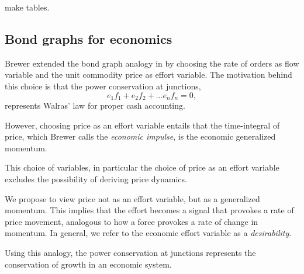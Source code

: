 \begin{tcolorbox}
make tables.
\end{tcolorbox}

\subsection{Bond graphs for economics}
Brewer extended the bond graph analogy in \cite{} by choosing the rate of orders as flow variable and the unit commodity price as effort variable.
The motivation behind this choice is that the power conservation at junctions,
\begin{equation*}
    e_1f_1+e_2f_2+\dots e_nf_n=0,
\end{equation*}
represents Walras' law for proper cash accounting.

However, choosing price as an effort variable entails that the time-integral of price, which Brewer calls the \textit{economic impulse}, is the economic generalized momentum.




This choice of variables, in particular the choice of price as an effort variable excludes the possibility of deriving price dynamics.

We propose to view price not as an effort variable, but as a generalized momentum.
This implies that the effort becomes a signal that provokes a rate of price movement, analogous to how a force provokes a rate of change in momentum.
In general, we refer to the economic effort variable as a \textit{desirability}.

Using this analogy, the power conservation at junctions represents the conservation of growth in an economic system. 
